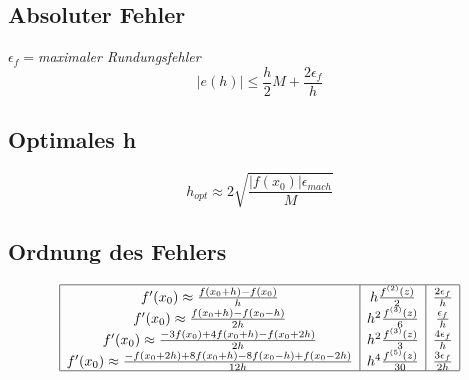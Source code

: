 \subsection{Absoluter Fehler}
$\epsilon_f = $\textit{maximaler Rundungsfehler}
\begin{equation*}
	|e(h)| \leq \frac{h}{2} M + \frac{2\epsilon_f}{h}
\end{equation*}

\subsection{Optimales h}
\begin{equation*}
	h_{opt} \approx 2 \sqrt{\frac{|f(x_0)| \epsilon_{mach}}{M}}
\end{equation*}

\subsection{Ordnung des Fehlers}
\begin{displaymath}
	\begin{array}{| c | c | c |}
		\hline
		f'(x_0) \approx \frac{f(x_0 + h) - f(x_0)}{h} & h \frac{f^{(2)}(z)}{2} & \frac{2\epsilon_f}{h} \\
		f'(x_0) \approx \frac{f(x_0 + h) - f(x_0 - h)}{2h} & h^2 \frac{f^{(3)}(z)}{6} & \frac{\epsilon_f}{h} \\
		f'(x_0) \approx \frac{-3f(x_0) + 4f(x_0 + h) - f(x_0 + 2h)}{2h} & h^2 \frac{f^{(3)}(z)}{3} & \frac{4\epsilon_f}{h} \\
		f'(x_0) \approx \frac{-f(x_0 + 2h) + 8f(x_0+h) -8f(x_0-h) + f(x_0-2h)}{12h} & h^4 \frac{f^{(5)}(z)}{30} & \frac{3\epsilon_f}{2h} \\
		\hline
	\end{array}
\end{displaymath}